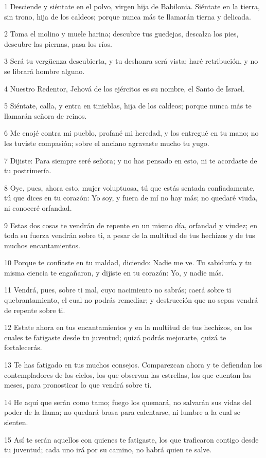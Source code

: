 \par 1 Desciende y siéntate en el polvo, virgen hija de Babilonia. Siéntate en la tierra, sin trono, hija de los caldeos; porque nunca más te llamarán tierna y delicada.
\par 2 Toma el molino y muele harina; descubre tus guedejas, descalza los pies, descubre las piernas, pasa los ríos.
\par 3 Será tu vergüenza descubierta, y tu deshonra será vista; haré retribución, y no se librará hombre alguno.
\par 4 Nuestro Redentor, Jehová de los ejércitos es su nombre, el Santo de Israel.
\par 5 Siéntate, calla, y entra en tinieblas, hija de los caldeos; porque nunca más te llamarán señora de reinos.
\par 6 Me enojé contra mi pueblo, profané mi heredad, y los entregué en tu mano; no les tuviste compasión; sobre el anciano agravaste mucho tu yugo.
\par 7 Dijiste: Para siempre seré señora; y no has pensado en esto, ni te acordaste de tu postrimería.
\par 8 Oye, pues, ahora esto, mujer voluptuosa, tú que estás sentada confiadamente, tú que dices en tu corazón: Yo soy, y fuera de mí no hay más; no quedaré viuda, ni conoceré orfandad.
\par 9 Estas dos cosas te vendrán de repente en un mismo día, orfandad y viudez; en toda su fuerza vendrán sobre ti, a pesar de la multitud de tus hechizos y de tus muchos encantamientos.
\par 10 Porque te confiaste en tu maldad, diciendo: Nadie me ve. Tu sabiduría y tu misma ciencia te engañaron, y dijiste en tu corazón: Yo, y nadie más.
\par 11 Vendrá, pues, sobre ti mal, cuyo nacimiento no sabrás; caerá sobre ti quebrantamiento, el cual no podrás remediar; y destrucción que no sepas vendrá de repente sobre ti.
\par 12 Estate ahora en tus encantamientos y en la multitud de tus hechizos, en los cuales te fatigaste desde tu juventud; quizá podrás mejorarte, quizá te fortalecerás.
\par 13 Te has fatigado en tus muchos consejos. Comparezcan ahora y te defiendan los contempladores de los cielos, los que observan las estrellas, los que cuentan los meses, para pronosticar lo que vendrá sobre ti.
\par 14 He aquí que serán como tamo; fuego los quemará, no salvarán sus vidas del poder de la llama; no quedará brasa para calentarse, ni lumbre a la cual se sienten.
\par 15 Así te serán aquellos con quienes te fatigaste, los que traficaron contigo desde tu juventud; cada uno irá por su camino, no habrá quien te salve. 

